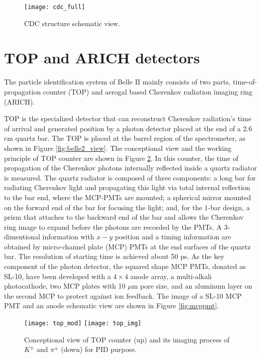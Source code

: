 \begin{figure}[H]
	\centering
	\texttt{[image: cdc\_full]}
	\caption{CDC structure schematic view\cite{Abe:2010gxa}.}
	\label{fig:cdc_full}
\end{figure}





\section{TOP and ARICH detectors}
The particle identification system of Belle II mainly consists of two parts, time-of-propagation counter (TOP) and aerogal based Cherenkov radiation imaging ring (ARICH).

TOP is the specialized detector that can reconstruct Cherenkov radiation's time of arrival and generated position by a photon detector placed at the end of a 2.6 cm quartz bar. The TOP is placed at the barrel region of the spectrometer, as shown in Figure \ref{fig:belle2_view}. The conceptional view and the working principle of TOP counter are shown in Figure \ref{fig:top}. In this counter, the time of propagation of the Cherenkov photons internally
reflected inside a quartz radiator is measured. The quartz radiator is composed of three components: a long bar for radiating
Cherenkov light and propagating this light via total internal reflection to the bar end, where the
MCP-PMTs are mounted; a spherical mirror mounted on the forward end of the bar for focusing
the light; and, for the 1-bar design, a prism that attaches to the backward end of the bar and
allows the Cherenkov ring image to expand before the photons are recorded by the PMTs. A 3-dimentional information with $x-y$ position and a timing information are obtained by micro-channel plate (MCP) PMTs at the end surfaces of the quartz bar.
The resolution of starting time is achieved about 50 ps\cite{Abe:2010gxa}. As the key component of the photon detector, the squared shape MCP PMTs, donated as SL-10\cite{inami2008cross}, have been developed with a $4\times 4$ anode array, a multi-alkali photocathode,
two MCP plates with 10 $\mu$m pore size, and an aluminum layer on the second MCP to protect
against ion feedback. The image of a SL-10 MCP PMT and an anode schematic view are shown in Figure \ref{fig:mcppmt}. 

\begin{figure}[htpb]
	\centering
	\texttt{[image: top\_mod]}
	\texttt{[image: top\_img]}
	\caption{Conceptional view of TOP counter (up) and its imaging process of $K^{\pm}$ and $\pi^{\pm}$ (down)\cite{Abe:2010gxa} for PID purpose.}
	\label{fig:top}
\end{figure}

